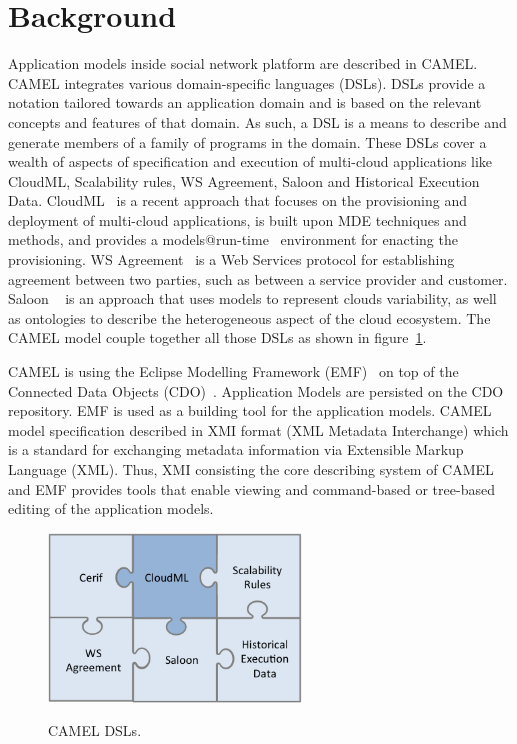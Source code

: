 \section{Background}
\label{sec:background}
Application models inside social network platform are described in CAMEL. CAMEL integrates various domain-specific languages (DSLs).
DSLs provide a notation tailored towards an application domain and is based on the relevant concepts and features of that domain. As such, a DSL is a means to describe and generate members of a family of programs in the domain. 
These DSLs cover a wealth of aspects of specification and execution of multi-cloud applications like CloudML, Scalability rules, WS Agreement, Saloon and Historical Execution Data. 
CloudML~\cite{FerryRossiniCMS13} is a recent approach that focuses on the provisioning and deployment of multi-cloud applications, is built upon MDE techniques and methods, and provides a models@run-time~\cite{models-runtime} environment for enacting the provisioning.  WS Agreement~\cite{andrieux2007web} is a Web Services protocol for establishing agreement between two parties, such as between a service provider and customer. Saloon ~\cite{quinton2013towards} is an approach that uses models to represent clouds variability, as well as ontologies to describe the heterogeneous aspect of the cloud ecosystem. The CAMEL model couple together all those DSLs as shown in figure~\ref{fig:dsls}.

CAMEL is using the Eclipse Modelling Framework (EMF)~\cite{steinberg2008emf} on top of the Connected Data Objects (CDO)~\cite{cdomodel}. Application Models are persisted on the CDO repository. EMF is used as a building tool for the application models. CAMEL model specification described in XMI format (XML Metadata Interchange) which is a standard for exchanging metadata information via Extensible Markup Language (XML). Thus, XMI consisting the core describing system of CAMEL and EMF provides tools that enable viewing and command-based or tree-based editing of the application models. 

\begin{figure}[h]
	\caption{CAMEL DSLs.}
	\includegraphics[width=0.6\textwidth,natwidth=200,natheight=150]{./fig/dsl.png}
	\centering
	\label{fig:dsls}
\end{figure}

